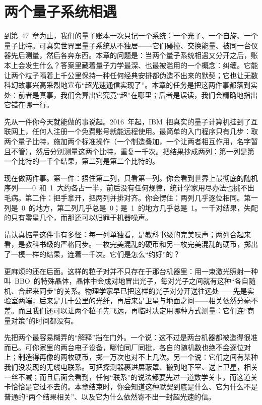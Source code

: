 \chapter{两个量子系统相遇}

到第~47~章为止，我们的量子账本一次只记一个系统：一个光子、一个自旋、一个量子比特。可真实世界里量子系统从不独居——它们碰撞、交换能量、被同一台仪器先后测量，然后各奔东西。本章的问题是：当两个量子系统相遇又分开之后，账本上会发生什么？答案里藏着量子力学最深、也最被滥用的一个概念：纠缠。它能让两个粒子隔着上千公里保持一种任何经典安排都伪造不出来的默契；它也让无数科幻故事兴高采烈地宣布“超光速通信实现了”。本章的任务是把这两件事都落到实处：前者是真事，我们会算出它究竟“超”在哪里；后者是误读，我们会精确地指出它错在哪一行。


先从一件你今天就能做的事说起。2016~年起，IBM~把真实的量子计算机挂到了互联网上，任何人注册一个免费账号就能远程使用。最简单的入门程序只有几步：取两个量子比特，施加两个标准操作（一个制造叠加，一个让两者相互作用，名字暂且不管），然后分别测量这两个比特，重复一千次。把结果抄成两列：第一列是第一个比特的一千个结果，第二列是第二个比特的。

现在做两件事。第一件：捂住第二列，只看第一列。你会看到世界上最彻底的随机序列——0~和~1~大约各占一半，前后没有任何规律，统计学家用尽办法也挑不出毛病。第二件：把手拿开，把两列并排对齐。你会愣住：两列几乎逐位相同。第一列是~0~的地方，第二列几乎总是~0；是~1~的地方几乎总是~1。一千对结果，失配的只有零星几个，而那还可以归罪于机器噪声。

请认真掂量这件事有多怪：每一列单独看，是教科书级的完美噪声；两列合起来看，是教科书级的严格同步。一枚完美混乱的硬币和另一枚完美混乱的硬币，掷出了一模一样的结果，连着一千次。它们是怎么“约好”的？

更麻烦的还在后面。这样的粒子对并不只存在于那台机器里：用一束激光照射一种叫~BBO~的特殊晶体，晶体中会成对地冒出光子，每对光子之间就有这种“各自随机、合起来同步”的关系。物理学家早已把这样的光子对分开送往远处——先是实验室两端，后来是几十公里的光纤，再后来是卫星与地面之间——相关依然分毫不差。而且我们还可以让两个粒子先飞远，再临时决定用哪种方式测量：它们连“商量对策”的时间都没有。

先把两个最容易糊弄的“解释”挡在门外。一个说：这不过是两台机器都被造得很准而已。可你家里的两台电子设备，哪怕同厂同批，各自的随机数也绝不会逐位对上；制造得再像的两枚硬币，掷一万次也对不上几次。另一个说：它们之间有某种我们没发现的无线电联系。可把探测器裹进屏蔽罩、搬到地下室、送上卫星，相关一丝不减；而且后面会看到，任何“联系”的说法都要先过一道数学关卡，而这道关卡恰恰是它过不去的。本章结束时，你会知道这种默契到底是什么、它为什么不是普通的“两个结果相关”、以及它为什么依然寄不出一封超光速的信。

